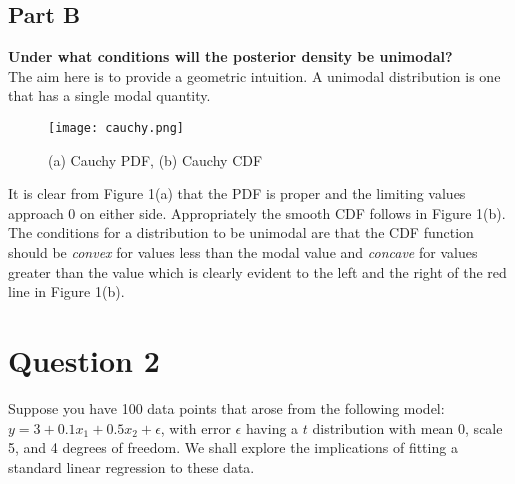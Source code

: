 \documentclass{article}
\begin{document}
\subsection{Part B}
\textbf{Under what conditions will the posterior density be unimodal?}\\
The aim here is to provide a geometric intuition. A unimodal distribution is one that has a single modal quantity.
 \begin{figure}[H]
\centering
\texttt{[image: cauchy.png]}
\caption{(a) Cauchy PDF, (b) Cauchy CDF}
\label{deltat}
\end{figure}
It is clear from Figure 1(a) that the PDF is proper and the limiting values approach 0 on either side. Appropriately the smooth CDF follows in Figure 1(b). The conditions for a distribution to be unimodal are that the CDF function should be \textit{convex} for values less than the modal value and \textit{concave} for values greater than the value which is clearly evident to the left and the right of the red line in Figure 1(b).
\section{Question 2}
Suppose you have 100 data points that arose from the following model: $y = 3 + 0.1 x_1 + 0.5 x_2 + \epsilon$, with error $\epsilon$ having a $t$ distribution with mean 0, scale 5, and 4 degrees of freedom. We shall explore the implications of fitting a standard linear regression to these data.
\end{document}
